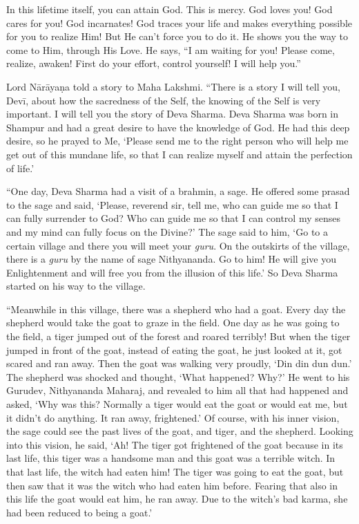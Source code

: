 In this lifetime itself, you can attain God. This is mercy. God loves you! God cares for you! God incarnates! God traces your life and makes everything possible for you to realize Him! But He can’t force you to do it. He shows you the way to come to Him, through His Love. He says, “I am waiting for you! Please come, realize, awaken! First do your effort, control yourself! I will help you.”

Lord Nārāyaṇa told a story to Maha Lakshmi. “There is a story I will tell you, Devī, about how the sacredness of the Self, the knowing of the Self is very important. I will tell you the story of Deva Sharma. Deva Sharma was born in Shampur and had a great desire to have the knowledge of God. He had this deep desire, so he prayed to Me, ‘Please send me to the right person who will help me get out of this mundane life, so that I can realize myself and attain the perfection of life.’

“One day, Deva Sharma had a visit of a brahmin, a sage. He offered some prasad to the sage and said, ‘Please, reverend sir, tell me, who can guide me so that I can fully surrender to God? Who can guide me so that I can control my senses and my mind can fully focus on the Divine?’ The sage said to him, ‘Go to a certain village and there you will meet your \textit{guru}. On the outskirts of the village, there is a \textit{guru} by the name of sage Nithyananda. Go to him! He will give you Enlightenment and will free you from the illusion of this life.’ So Deva Sharma started on his way to the village.

“Meanwhile in this village, there was a shepherd who had a goat. Every day the shepherd would take the goat to graze in the field. One day as he was going to the field, a tiger jumped out of the forest and roared terribly! But when the tiger jumped in front of the goat, instead of eating the goat, he just looked at it, got scared and ran away. Then the goat was walking very proudly, ‘Din din dun dun.’ The shepherd was shocked and thought, ‘What happened? Why?’ He went to his Gurudev, Nithyananda Maharaj, and revealed to him all that had happened and asked, ‘Why was this? Normally a tiger would eat the goat or would eat me, but it didn’t do anything. It ran away, frightened.’ Of course, with his inner vision, the sage could see the past lives of the goat, and tiger, and the shepherd. Looking into this vision, he said, ‘Ah! The tiger got frightened of the goat because in its last life, this tiger was a handsome man and this goat was a terrible witch. In that last life, the witch had eaten him! The tiger was going to eat the goat, but then saw that it was the witch who had eaten him before. Fearing that also in this life the goat would eat him, he ran away. Due to the witch’s bad karma, she had been reduced to being a goat.’

